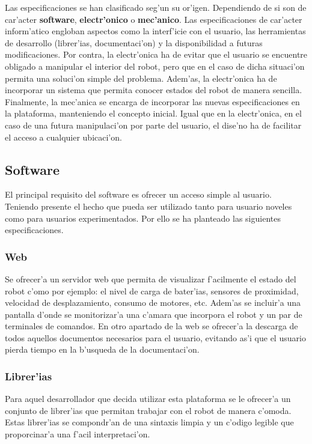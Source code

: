 \documentclass[twoside]{article}
\begin{document}
Las especificaciones se han clasificado seg'un su or'igen. Dependiendo de si son de car'acter \textbf{software}, \textbf{electr'onico} o \textbf{mec'anico}. Las especificaciones de car'acter inform'atico engloban aspectos como la interf'icie con el usuario, las herramientas de desarrollo (librer'ias, documentaci'on) y la disponibilidad a futuras modificaciones. Por contra, la electr'onica ha de evitar que el usuario se encuentre obligado a manipular el interior del robot, pero que en el caso de dicha situaci'on permita una soluci'on simple del problema. Adem'as, la electr'onica ha de incorporar un sistema que permita conocer estados del robot de manera sencilla. Finalmente, la mec'anica se encarga de incorporar las nuevas especificaciones en la plataforma, manteniendo el concepto inicial. Igual que en la electr'onica, en el caso de una futura manipulaci'on por parte del usuario, el dise'no ha de facilitar el acceso a cualquier ubicaci'on.

\subsection{Software}
El principal requisito del software es ofrecer un acceso simple al usuario. Teniendo presente el hecho que pueda ser utilizado tanto para usuario noveles como para usuarios experimentados. Por ello se ha planteado las siguientes especificaciones.

\subsubsection{Web}
Se ofrecer'a un servidor web que permita de visualizar f'acilmente el estado del robot c'omo por ejemplo: el nivel de carga de bater'ias, sensores de proximidad, velocidad de desplazamiento, consumo de motores, etc. Adem'as se incluir'a una pantalla d'onde se monitorizar'a una c'amara que incorpora el robot y un par de terminales de comandos.
En otro apartado de la web se ofrecer'a la descarga de todos aquellos documentos necesarios para el usuario, evitando as'i que el usuario pierda tiempo en la b'usqueda de la documentaci'on.

\subsubsection{Librer'ias}
Para aquel desarrollador que decida utilizar esta plataforma se le ofrecer'a un conjunto de librer'ias que permitan trabajar con el robot de manera c'omoda. Estas librer'ias se compondr'an de una sintaxis limpia y un c'odigo legible que proporcinar'a una f'acil interpretaci'on.    
\end{document}
